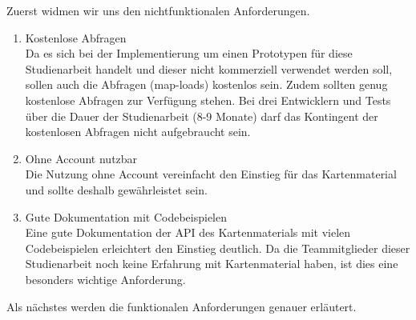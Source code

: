 Zuerst widmen wir uns den nichtfunktionalen Anforderungen.
\begin{enumerate}
\item Kostenlose Abfragen \\
Da es sich bei der Implementierung um einen Prototypen für diese Studienarbeit handelt und dieser nicht kommerziell verwendet werden soll, sollen auch die Abfragen (map-loads) kostenlos sein. Zudem sollten genug kostenlose Abfragen zur Verfügung stehen. Bei drei Entwicklern und Tests über die Dauer der Studienarbeit (8-9 Monate) darf das Kontingent der kostenlosen Abfragen nicht aufgebraucht sein.

\item Ohne Account nutzbar\\
Die Nutzung ohne Account vereinfacht den Einstieg für das Kartenmaterial und sollte deshalb gewährleistet sein. 

\item Gute Dokumentation mit Codebeispielen\\

Eine gute Dokumentation der API des Kartenmaterials mit vielen Codebeispielen erleichtert den Einstieg deutlich. Da die Teammitglieder dieser Studienarbeit noch keine Erfahrung mit Kartenmaterial haben, ist dies eine besonders wichtige Anforderung. 


\end{enumerate}



Als nächstes werden die funktionalen Anforderungen genauer erläutert.

